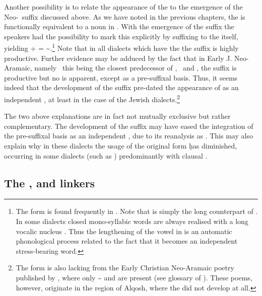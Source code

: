 Another possibility is to relate the appearance of the  \lnk* to the emergence of the Neo-\cst\ suffix \ed discussed above. As we have noted in the previous chapters, the \lnk* is functionally equivalent to a noun in \cst*. With the emergence of the suffix \ed the speakers had the possibility to mark this explicitly by suffixing \ed to the \lnk* itself, yielding  +  = \~.\footnote{The form  is found frequently in \JZax. Note that  is simply the long counterpart of . In some dialects closed mono-syllabic words are always realised with a long vocalic nucleus \citep[cf.][307, fn.\ 6]{GutmanGaznax}. Thus the lengthening of the vowel in  is an automatic phonological process related to the fact that it becomes an independent stress-bearing word.}
 Note that in all dialects which have the  \lnk* the suffix \ed is highly productive. Further evidence may be adduced by the fact that in Early J. Neo-Aramaic, namely \Nrt\, this being the closest predecessor of \JZax, \Amd\ and \Betn, the \ed suffix is productive but no  \lnk* is apparent, except as a pre-suffixal basis. Thus, it seems indeed that the development of the \ed suffix pre-dated the appearance of  as an independent \lnk*, at least in the case of the Jewish dialects.\footnote{The form  is also lacking from the Early Christian Neo-Aramaic poetry published by \citet{MengozziPoetry2002, MengozziPoetry2011}, where only \~ and  are present (see glossary of \cite[205f.]{MengozziPoetry2002}). These poems, however, originate in the region of Alqosh, where the  \lnk* did not develop at all.}

The two above explanations are in fact not mutually exclusive but rather complementary. The development of the  suffix \ed may have eased the integration of the pre-suffixal basis  as an independent \lnk*, due to its reanalysis as . This may also explain why in these dialects the usage of the original \lnk* form \d has diminished, occurring in some dialects (such as \JZax) predominantly with clausal \secns.

\subsection{The ,  and  linkers} \label{ss:od_lnk}


